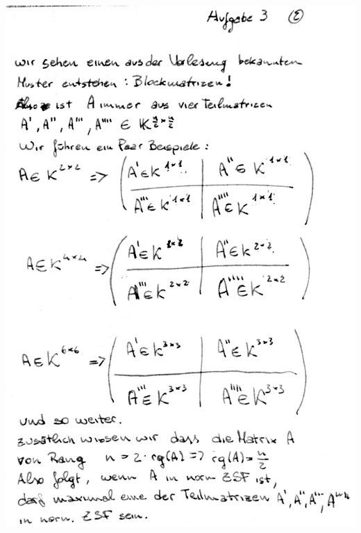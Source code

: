 \documentclass[10pt,a4paper]{article}
\begin{document}
\includegraphics[scale=0.25]{lat1_6.jpg}  \\
\end{document}
